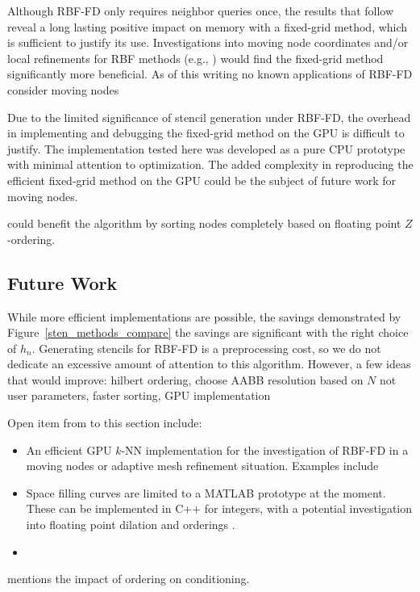 \documentclass{report}
\begin{document}
Although RBF-FD only requires neighbor queries once, the results that follow reveal a long lasting positive impact on memory with a fixed-grid method, which is sufficient to justify its use. Investigations into moving node coordinates and/or local refinements for RBF methods (e.g., \cite{FlyerLehto10}) would find the fixed-grid method significantly more beneficial. As of this writing no known applications of RBF-FD consider moving nodes

Due to the limited significance of stencil generation under RBF-FD, the overhead in implementing and debugging the fixed-grid method on the GPU is difficult to justify. The implementation tested here was developed as a pure CPU prototype with minimal attention to optimization. The added complexity in reproducing the efficient fixed-grid method on the GPU could be the subject of future work for moving nodes. 

\cite{Connor2009} could benefit the algorithm by sorting nodes completely based on floating point $Z$-ordering.




\subsection{Future Work}

While more efficient implementations are possible, the savings demonstrated by Figure~\ref{sten_methods_compare} the savings are significant with the right choice of $h_n$. Generating stencils for RBF-FD is a preprocessing cost, so we do not dedicate an excessive amount of attention to this algorithm. However, a few ideas that would improve: hilbert ordering, choose AABB resolution based on $N$ not user parameters, faster sorting, GPU implementation

Open item from to this section include: 
\begin{itemize} 
\item An efficient GPU $k$-NN implementation for the investigation of RBF-FD in a moving nodes or adaptive mesh refinement situation. Examples include \cite{Pan2011, Goswami2010, Connor2009}
\item Space filling curves are limited to a MATLAB prototype at the moment. These can be implemented in C++ for integers, with a potential investigation into floating point dilation and orderings \cite{Connor2009}.
\item 
\end{itemize}

\cite{Saad2003} mentions the impact of ordering on conditioning.
\end{document}
